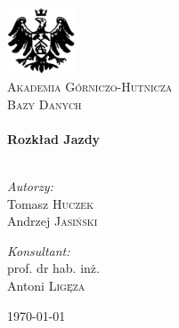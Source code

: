 \begin{titlepage}

\begin{center}

\includegraphics[width=0.15\textwidth]{./img/logo.eps}\\[1cm]

\textsc{\LARGE Akademia Górniczo-Hutnicza}\\[1.5cm]

\textsc{\Large Bazy Danych}\\[0.5cm]


\HRule \\[0.4cm]
{ \huge \bfseries Rozkład Jazdy}\\[0.4cm]

\HRule \\[1.5cm]

\begin{minipage}{0.4\textwidth}
\begin{flushleft} \large
\emph{Autorzy:}\\
Tomasz \textsc{Huczek}\\
Andrzej \textsc{Jasiński}
\end{flushleft}
\end{minipage}
\begin{minipage}{0.4\textwidth}
\begin{flushright} \large
\emph{Konsultant:} \\
prof. dr hab. inż. \\ Antoni \textsc{Ligęza}
\end{flushright}
\end{minipage}

\vfill

{\large \today}

\end{center}

\end{titlepage}
